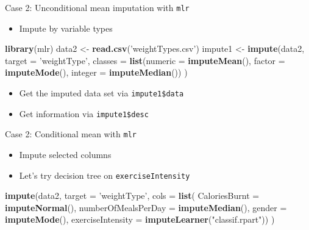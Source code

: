 \documentclass[ignorenonframetext,]{beamer}
\newenvironment{Shaded}{\begin{snugshade}}{\end{snugshade}}
\newcommand{\KeywordTok}[1]{\textcolor[rgb]{0.13,0.29,0.53}{\textbf{#1}}}
\newcommand{\DataTypeTok}[1]{\textcolor[rgb]{0.13,0.29,0.53}{#1}}
\newcommand{\StringTok}[1]{\textcolor[rgb]{0.31,0.60,0.02}{#1}}
\newcommand{\NormalTok}[1]{#1}
\providecommand{\tightlist}{%
  \setlength{\itemsep}{0pt}\setlength{\parskip}{0pt}}
\begin{document}
\begin{frame}[fragile]{Case 2: Unconditional mean imputation with
\texttt{mlr}}

\begin{itemize}
\tightlist
\item
  Impute by variable types
\end{itemize}

\begin{Shaded}
\begin{Highlighting}[]
\KeywordTok{library}\NormalTok{(mlr)}
\NormalTok{data2   <-}\StringTok{ }\KeywordTok{read.csv}\NormalTok{(}\StringTok{'weightTypes.csv'}\NormalTok{)}
\NormalTok{impute1 <-}\StringTok{ }\KeywordTok{impute}\NormalTok{(data2, }\DataTypeTok{target =} \StringTok{'weightType'}\NormalTok{, }
                  \DataTypeTok{classes =} \KeywordTok{list}\NormalTok{(}\DataTypeTok{numeric =} \KeywordTok{imputeMean}\NormalTok{(),}
                                 \DataTypeTok{factor  =} \KeywordTok{imputeMode}\NormalTok{(),}
                                 \DataTypeTok{integer =} \KeywordTok{imputeMedian}\NormalTok{())}
\NormalTok{                  )}
\end{Highlighting}
\end{Shaded}

\begin{itemize}
\tightlist
\item
  Get the imputed data set via \texttt{impute1\$data}
\item
  Get information via \texttt{impute1\$desc}
\end{itemize}

\end{frame}

\begin{frame}[fragile]{Case 2: Conditional mean with \texttt{mlr}}

\begin{itemize}
\tightlist
\item
  Impute selected columns
\item
  Let's try decision tree on \texttt{exerciseIntensity}
\end{itemize}

\begin{Shaded}
\begin{Highlighting}[]
\KeywordTok{impute}\NormalTok{(data2, }\DataTypeTok{target =} \StringTok{'weightType'}\NormalTok{, }
       \DataTypeTok{cols =} \KeywordTok{list}\NormalTok{(}
         \DataTypeTok{CaloriesBurnt       =} \KeywordTok{imputeNormal}\NormalTok{(),}
         \DataTypeTok{numberOfMealsPerDay =} \KeywordTok{imputeMedian}\NormalTok{(),}
         \DataTypeTok{gender              =} \KeywordTok{imputeMode}\NormalTok{(),}
         \DataTypeTok{exerciseIntensity   =} \KeywordTok{imputeLearner}\NormalTok{(}\StringTok{"classif.rpart"}\NormalTok{))}
\NormalTok{)}
\end{Highlighting}
\end{Shaded}

\end{frame}
\end{document}
